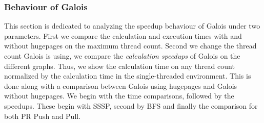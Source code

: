 

\subsubsection{Behaviour of Galois}
\label{sec:galois_speedup}
This section is dedicated to analyzing the speedup behaviour of Galois under two parameters. First we compare the calculation and execution times with and without hugepages on the maximum thread count.
Second we change the thread count Galois is using, we compare the \emph{calculation speedups} of Galois on the different graphs.
Thus, we show the calculation time on any thread count normalized by the calculation time in the single-threaded environment.
This is done along with a comparison between Galois using hugepages and Galois without hugepages.
We begin with the time comparisons, followed by the speedups. These begin with SSSP, second by BFS and finally the comparison for both PR Push and Pull.

